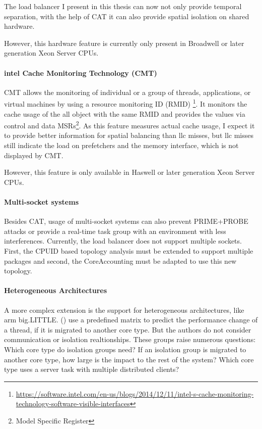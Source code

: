 The load balancer I present in  this thesis can now not only provide temporal
separation, with the help of CAT it can also provide spatial isolation on
shared hardware.

However, this hardware feature is currently only present in Broadwell or later
generation Xeon Server CPUs.

\paragraph{\gls{intel} Cache Monitoring Technology (CMT)}
CMT allows the monitoring of individual or a group of threads, applications, or
virtual machines by using a resource monitoring ID (RMID)
\footnote{
  \url{https://software.intel.com/en-us/blogs/2014/12/11/intel-s-cache-monitoring-technology-software-visible-interfaces}}.
It monitors the cache usage of the all object with the same RMID and provides
the values via control and data MSRs\footnote{Model Specific Register}.
As this feature measures actual cache usage, I expect it to provide better
information for spatial balancing than \gls{llc} misses, but \gls{llc} misses still
indicate the load on prefetchers and the memory interface, which is not
displayed by CMT.

However, this feature is only available in Haswell or later generation
Xeon Server CPUs.

\paragraph{Multi-socket systems}
Besides CAT, usage of multi-socket systems can also prevent PRIME+PROBE attacks
or provide a real-time task group with an environment with less interferences.
Currently, the load balancer does not support multiple sockets.
First, the CPUID based topology analysis must be extended to support multiple
packages and second, the CoreAccounting must be adapted to use this new
topology.

\paragraph{Heterogeneous Architectures}
A more complex extension is the support for heterogeneous architectures, like
\gls{arm} big.LITTLE.
\citeauthor{sarma_smartbalance_2015} (\cite{sarma_smartbalance_2015}) use a
predefined matrix to predict the performance change of a thread,
if it is migrated to another core type.
But the authors do not consider communication or isolation realtionships.
These groups raise numerous questions: Which core type do isolation groups
need?
If an isolation group is migrated to another core type, how large is the impact
to the rest of the system?
Which core type uses a server task with multiple distributed clients?

